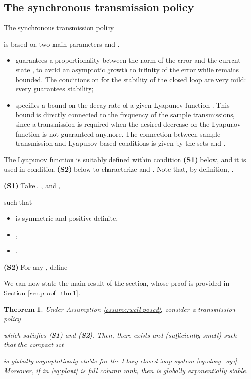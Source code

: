\documentclass[twocolumn]{autart}
\newtheorem{theorem}{Theorem}
\begin{document}
\subsection{The synchronous transmission policy}

The { synchronous} transmission policy 
 
is based on two main parameters  and .
{
\begin{itemize}
\item  guarantees a proportionality between the norm of the error  
and the current state , to avoid an asymptotic growth to infinity of the
error  while  remains bounded. The conditions on  for
the stability of the closed loop are very mild: every 
guarantees stability;
 \item  specifies a bound on
the decay rate of a given Lyapunov function . This bound is 
directly connected to the frequency of the sample transmissions,
since a transmission is required when the desired
decrease on the Lyapunov function is not guaranteed anymore.
The connection between sample transmission and Lyapunov-based
conditions is given by the sets  and .
\end{itemize}
The Lyapunov function  is suitably defined within condition \textbf{(S1)} below,
and it is used in condition \textbf{(S2)} below to characterize 
 and . 
Note that, by definition, .
}

\noindent\textbf{(S1)}
{Take} , , and 
, 

such that
\begin{itemize}
 \item   is symmetric
and positive definite,
\item ,
\item .
\end{itemize}
\textbf{(S2)} For any , define

We can now state the main result of the section, whose proof
is provided in Section \ref{sec:proof_thm1}.
\begin{theorem} 
\label{thm:GAS_synchronous}
Under Assumption \ref{assume:well-posed}, 
consider a transmission policy 

which satisfies (\textbf{S1}) and (\textbf{S2}). 
Then, there exists  and  (sufficiently small) 
such that  the compact set 

is globally asymptotically stable for the 
t-lazy closed-loop system \eqref{eq:elazy_sys}. Moreover,
if  in \eqref{eq:plant} is full column rank, then 
 is globally exponentially stable.
\end{theorem}
\end{document}
